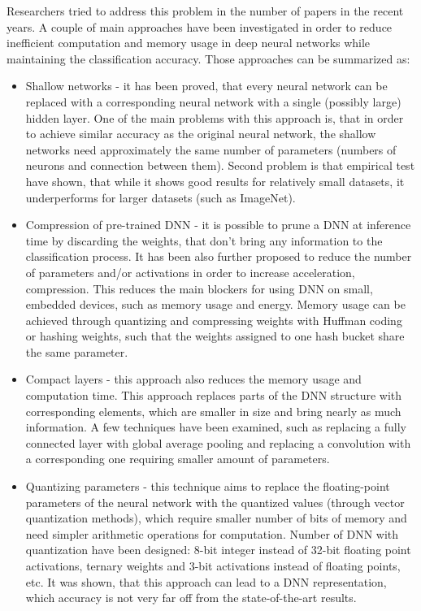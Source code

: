 \documentclass[licencjacka]{pracamgr}
\begin{document}
	Researchers tried to address this problem in the number of papers in the recent years. A couple of main approaches have been investigated in order to reduce inefficient computation and memory usage in deep neural networks while maintaining the classification accuracy. Those approaches can be summarized as:

	\begin{itemize}
		\item Shallow networks - it has been proved, that every neural network can be replaced with a corresponding neural network with a single (possibly large) hidden layer. One of the main problems with this approach is, that in order to achieve similar accuracy as the original neural network, the shallow networks need approximately the same number of parameters (numbers of neurons and connection between them). Second problem is that empirical test have shown, that while it shows good results for relatively small datasets, it underperforms for larger datasets (such as ImageNet).
		\item Compression of pre-trained DNN - it is possible to prune a DNN at inference time by discarding the weights, that don’t bring any information to the classification process. It has been also further proposed to reduce the number of parameters and/or activations in order to increase acceleration, compression. This reduces the main blockers for using DNN on small, embedded devices, such as memory usage and energy. Memory usage can be achieved through quantizing and compressing weights with Huffman coding or hashing weights, such that the weights assigned to one hash bucket share the same parameter.
		\item Compact layers - this approach also reduces the memory usage and computation time. This approach replaces parts of the DNN structure with corresponding elements, which are smaller in size and bring nearly as much information. A few techniques have been examined, such as replacing a fully connected layer with global average pooling and replacing a convolution with a corresponding one requiring smaller amount of parameters.
		\item Quantizing parameters - this technique aims to replace the floating-point parameters of the neural network with the quantized values (through vector quantization methods), which require smaller number of bits of memory and need simpler arithmetic operations for computation. Number of DNN with quantization have been designed: 8-bit integer instead of 32-bit floating point activations, ternary weights and 3-bit activations instead of floating points, etc. It was shown, that this approach can lead to a DNN representation, which accuracy is not very far off from the state-of-the-art results.

\end{itemize}
\end{document}
